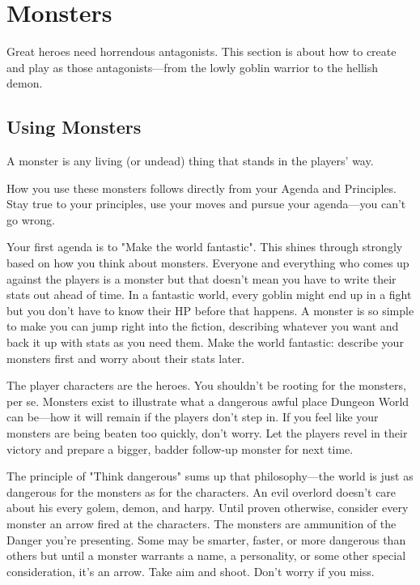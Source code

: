 \chapter{Monsters}
  
 



Great heroes need horrendous antagonists. This section is about how to create and play as those antagonists—from the lowly goblin warrior to the hellish demon.

 
\section{Using Monsters}   
 

A monster is any living (or undead) thing that stands in the players' way.

 

How you use these monsters follows directly from your Agenda and Principles. Stay true to your principles, use your moves and pursue your agenda—you can't go wrong. 

 

Your first agenda is to "Make the world fantastic". This shines through strongly based on how you think about monsters. Everyone and everything who comes up against the players is a monster but that doesn't mean you have to write their stats out ahead of time. In a fantastic world, every goblin might end up in a fight but you don't have to know their HP before that happens. A monster is so simple to make you can jump right into the fiction, describing whatever you want and back it up with stats as you need them. Make the world fantastic: describe your monsters first and worry about their stats later.

 

The player characters are the heroes. You shouldn't be rooting for the monsters, per se. Monsters exist to illustrate what a dangerous awful place Dungeon World can be—how it will remain if the players don't step in. If you feel like your monsters are being beaten too quickly, don't worry. Let the players revel in their victory and prepare a bigger, badder follow-up monster for next time.

 

The principle of "Think dangerous" sums up that philosophy—the world is just as dangerous for the monsters as for the characters. An evil overlord doesn't care about his every golem, demon, and harpy. Until proven otherwise, consider every monster an arrow fired at the characters. The monsters are ammunition of the Danger you're presenting. Some may be smarter, faster, or more dangerous than others but until a monster warrants a name, a personality, or some other special consideration, it's an arrow. Take aim and shoot. Don't worry if you miss.

